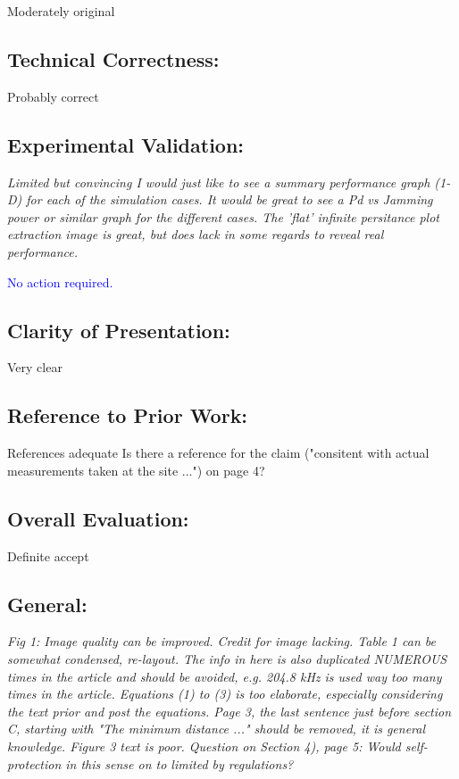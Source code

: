 \documentclass[11pt]{amsart}
\begin{document}
 Moderately original

\subsection{Technical Correctness:}

 Probably correct

\subsection{Experimental Validation:}

\emph{ Limited but convincing I would just like to see a summary performance graph (1-D) for each of the simulation cases. It would be great to see a Pd vs Jamming power or similar graph for the different cases. The 'flat' infinite persitance plot extraction image is great, but does lack in some regards to reveal real performance.}

\textcolor{blue}{
No action required.}

\subsection{Clarity of Presentation:}

 Very clear

\subsection{Reference to Prior Work: }

References adequate Is there a reference for the claim ("consitent with actual measurements taken at the site ...") on page 4?

\subsection{Overall Evaluation: }

Definite accept

\subsection{General:}

\emph{Fig 1: Image quality can be improved. Credit for image lacking. Table 1 can be somewhat condensed, re-layout. The info in here is also duplicated NUMEROUS times in the article and should be avoided, e.g. 204.8 kHz is used way too many times in the article. Equations (1) to (3) is too elaborate, especially considering the text prior and post the equations. Page 3, the last sentence just before section C, starting with "The minimum distance ..." should be removed, it is general knowledge. Figure 3 text is poor.  Question on Section 4), page 5: Would self-protection in this sense on to limited by regulations?}
\end{document}
